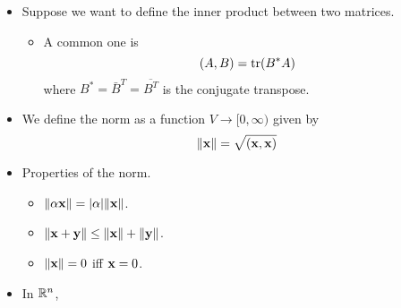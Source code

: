 \documentclass[../../notes.tex]{subfiles}
\begin{document}
\begin{itemize}
\begin{equation*}
    \end{equation*}
    \item Suppose we want to define the inner product between two matrices.
    \begin{itemize}
        \item A common one is
        \begin{equation*}
            (A,B) = \trace(B^*A)
        \end{equation*}
        where $B^*=\bar{B}^T=\overline{B^T}$ is the conjugate transpose.
    \end{itemize}
    \item We define the norm as a function $V\to[0,\infty)$ given by
    \begin{equation*}
        \norm{\mathbf{x}} = \sqrt{(\mathbf{x},\mathbf{x})}
    \end{equation*}
    \item Properties of the norm.
    \begin{itemize}
        \item $\norm{\alpha\mathbf{x}}=|\alpha|\norm{\mathbf{x}}$.
        \item $\norm{\mathbf{x}+\mathbf{y}}\leq\norm{\mathbf{x}}+\norm{\mathbf{y}}$.
        \item $\norm{\mathbf{x}}=0$ iff $\mathbf{x}=0$.
    \end{itemize}
    \item In $\mathbb{R}^n$,
    \begin{figure}[h!]
        \centering
\end{figure}
\end{itemize}
\end{document}
